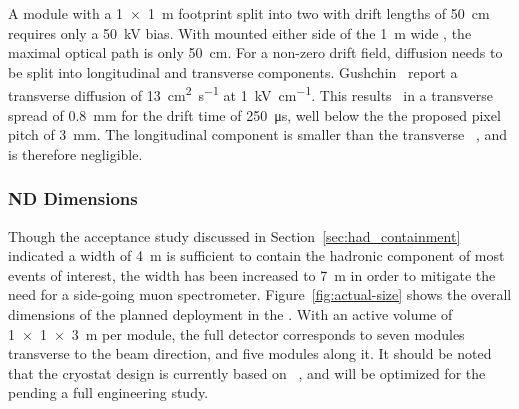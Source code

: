 A module with a \SI{1x1}{\metre} footprint split into two  with drift lengths of \SI{50}{\centi\metre} requires only a \SI{50}{\kilo\volt} bias.
With  mounted either side of the \SI{1}{\metre} wide , the maximal optical path is only \SI{50}{\centi\metre}.
For a non-zero drift field, diffusion needs to be split into longitudinal and transverse components. Gushchin~\cite{gushchin} report a transverse diffusion of \SI{13}{\centi\metre\squared\per\second} at \SI{1}{\kilo\volt\per\centi\metre}.
This results~\cite{Chepel:2012sj} in a transverse spread of \SI{0.8}{\milli\metre} for the drift time of \SI{250}{\micro\second}, well below the the proposed pixel pitch of \SI{3}{\milli\metre}.
The longitudinal component is smaller than the transverse ~\cite{Chepel:2012sj},  and is therefore negligible.

\subsubsection{ND Dimensions}
\label{sec:det_dimensions}

Though the acceptance study discussed in Section~\ref{sec:had_containment} indicated a width of \SI{4}{\metre} is sufficient to contain the hadronic component of most events of interest, the width has been increased to 
\SI{7}{\metre} in order to mitigate the need for a side-going muon spectrometer.
Figure~\ref{fig:actual-size} shows the overall dimensions of the planned  deployment in the   . 
With an active volume of \SI{1x1x3}{\metre} per module, the full  detector corresponds to seven modules transverse to the beam direction, and five modules along it. 
It should be noted that the cryostat design is currently based on ~\cite{Abi:2017aow}, and will be optimized for the   pending a full engineering study.  

